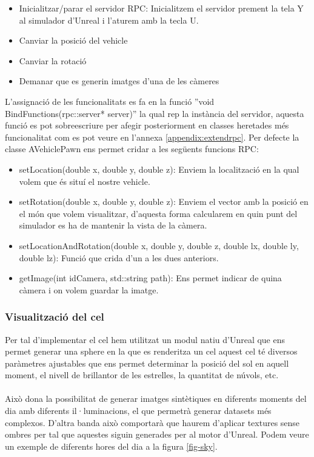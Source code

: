 \documentclass[10pt,a4paper,twocolumn,twoside]{article}
\begin{document}
\begin{itemize}
\item Inicialitzar/parar el servidor RPC: Inicialitzem el servidor prement la tela Y al simulador d'Unreal i l'aturem amb la tecla U.
\item Canviar la posició del vehicle
\item Canviar la rotació
\item Demanar que es generin imatges d'una de les càmeres
\end{itemize}

L'assignació de les funcionalitats es fa en la funció ''void BindFunctions(rpc::server* server)'' la qual rep la instància del servidor, aquesta funció es pot sobreescriure per afegir posteriorment en classes heretades més funcionalitat com es pot veure en l'annexa \ref{appendix:extendrpc}. Per defecte la classe AVehiclePawn ens permet cridar a les següents funcions RPC:

\begin{itemize}
\item setLocation(double x, double y, double z): Enviem la localització en la qual volem que és situí el nostre vehicle.
\item setRotation(double x, double y, double z): Enviem el vector amb la posició en el món que volem visualitzar, d'aquesta forma calcularem en quin punt del simulador es ha de mantenir la vista de la càmera.
\item setLocationAndRotation(double x, double y, double z, double lx, double ly, double lz): Funció que crida d'un a les dues anteriors.
\item getImage(int idCamera, std::string path): Ens permet indicar de quina càmera i on volem guardar la imatge.
\end{itemize}

\subsubsection{Visualització del cel}
Per tal d'implementar el cel hem utilitzat un modul natiu d'Unreal que ens permet generar una sphere en la que es renderitza un cel aquest cel té diversos paràmetres ajustables que ens permet determinar la posició del sol en aquell moment, el nivell de brillantor de les estrelles, la quantitat de núvols, etc. 
\\\\
Això dona la possibilitat de generar imatges sintètiques en diferents moments del dia amb diferents il·luminacions, el que permetrà generar datasets més complexos. D'altra banda això comportarà que haurem d'aplicar textures sense ombres per tal que aquestes siguin generades per al motor d'Unreal. Podem veure un exemple de diferents hores del dia a la figura \ref{fig-sky}.
\end{document}
